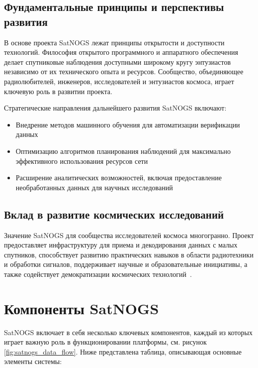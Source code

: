 \subsection{Фундаментальные принципы и перспективы развития}

В основе проекта SatNOGS лежат принципы открытости и доступности технологий.
Философия открытого программного и аппаратного обеспечения делает спутниковые
наблюдения доступными широкому кругу энтузиастов независимо от их технического
опыта и ресурсов. Сообщество, объединяющее радиолюбителей, инженеров,
исследователей и энтузиастов космоса, играет ключевую роль в развитии проекта.

Стратегические направления дальнейшего развития SatNOGS включают:

\begin{itemize}
	\item Внедрение методов машинного обучения для автоматизации верификации данных
	\item Оптимизацию алгоритмов планирования наблюдений для максимально эффективного использования ресурсов сети
	\item Расширение аналитических возможностей, включая предоставление необработанных данных для научных исследований
\end{itemize}

\subsection{Вклад в развитие космических исследований}

Значение SatNOGS для сообщества исследователей космоса многогранно. Проект
предоставляет инфраструктуру для приема и декодирования данных с малых
спутников, способствует развитию практических навыков в области радиотехники и
обработки сигналов, поддерживает научные и образовательные инициативы, а также
содействует демократизации космических технологий~\cite{satnogs_general_docs}.

\section{Компоненты SatNOGS}

SatNOGS включает в себя несколько ключевых компонентов, каждый из которых
играет важную роль в функционировании платформы, см. рисунок
\ref{fig:satnogs_data_flow}.
Ниже представлена таблица, описывающая основные элементы системы:

